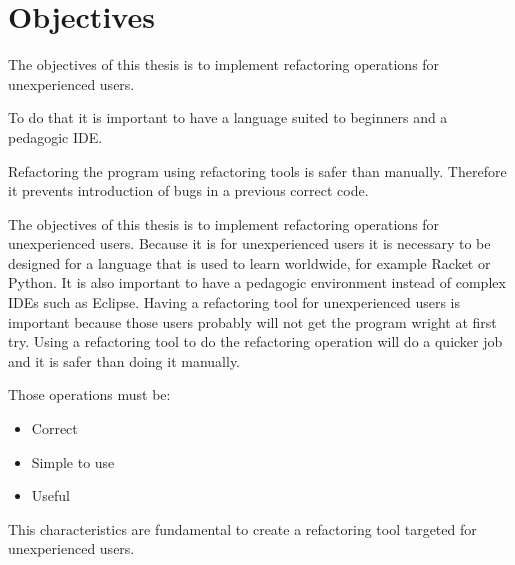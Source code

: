 
% 
% 

\section{Objectives}

The objectives of this thesis is to implement refactoring operations for unexperienced users.

To do that it is important to have a language suited to beginners and a pedagogic IDE.

Refactoring the program using refactoring tools is safer than manually. Therefore it prevents introduction of bugs in a previous correct code.


The objectives of this thesis is to implement refactoring operations for unexperienced users.
Because it is for unexperienced users it is necessary to be designed for a language that is used to learn worldwide, for example Racket or Python.
It is also important to have a pedagogic environment instead of complex IDEs such as Eclipse.
Having a refactoring tool for unexperienced users is important because those users probably will not get the program wright at first try.
Using a refactoring tool to do the refactoring operation will do a quicker job and it is safer than doing it manually.

Those operations must be:
\begin{itemize}
\item Correct
\item Simple to use
\item Useful
\end{itemize}

This characteristics are fundamental to create a refactoring tool targeted for unexperienced users.